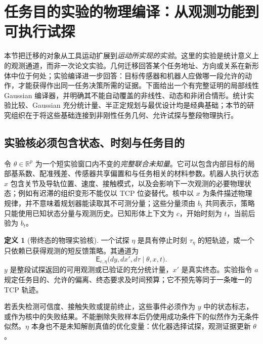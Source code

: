 \documentclass[11pt,a4paper]{article}
\numberwithin{equation}{section}
\theoremstyle{definition}
\newtheorem{definition}[theorem]{定义}
\newcommand{\R}{\mathbb R}
\begin{document}
\section{任务目的实验的物理编译：从观测功能到可执行试探}
\label{cmp:section}

本节把迁移的对象从工具运动扩展到\emph{运动所实现的实验}。这里的实验是统计意义上的观测通道，而非一次论文实验。几何迁移回答某个任务地址、方向或关系在新形体中位于何处；实验编译进一步回答：目标传感器和机器人应做哪一段允许的动作，才能获得作出同一任务决策所需的证据。下面给出一个有完整证明的局部线性 Gaussian 编译器，并明确其不能自动覆盖的非线性、动态和非闭合情形。统计实验比较、Gaussian 充分统计量、半正定规划与最优设计均是经典基础\cite{blackwell1953,boyd2004}；本节的研究组织在于将这些基础连接到非刚性任务几何、允许试探与整段物理执行。

\subsection{实验核必须包含状态、时刻与任务目的}
\label{cmp:kernels}

令 $\theta\in\R^p$ 为一个短实验窗口内不变的\emph{完整联合未知量}。它可以包含内部目标的局部基系数、配准残差、传感器共享偏置和与任务相关的材料参数。机器人执行状态 $x$ 包含关节及导轨位置、速度、接触模式，以及会影响下一次观测的必要物理状态；例如有迟滞的组织变形不能仅以 TCP 位姿替代。核中以 $x$ 为条件描述物理规律，并不意味着规划器能读取其不可测分量；这些分量须由 $b_t$ 共同表示，策略只能使用已知状态分量与观测历史。已知形体上下文为 $c$，开始时刻为 $t$，当前后验为 $b_t$。

\begin{definition}[带终态的物理实验核]
\label{cmp:def-kernel}
一个试探 $\eta$ 是具有停止时刻 $\tau_\eta$ 的短轨迹，或一个只依赖已获得观测的短反馈策略。其通道为
\begin{equation}
 \mathsf E_{c,\eta}
 \bigl(dy,dx',d\tau\mid\theta,x,t\bigr).
 \label{cmp:physical-kernel}
\end{equation}
$y$ 是整段试探返回的可用观测或已验证的充分统计量，$x'$ 是真实终态。实验指令 $a$ 规定任务目的、允许的偏离、终态要求及时间预算；它不预先等同于一条唯一的 TCP 轨迹。
\end{definition}

若丢失检测可信度、接触失败或提前终止，这些事件必须作为 $y$ 中的状态标志，或作为核中的失败结果。不能删除失败样本后仍使用成功条件下的似然作为无条件似然。$\eta$ 本身也不是未知解剖真值的优化变量：优化器选择试探，观测证据更新 $\theta$。
\end{document}
